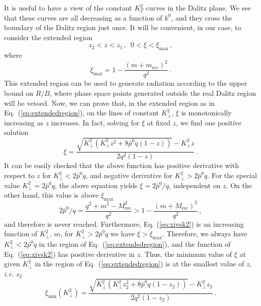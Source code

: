 \documentclass[11pt,a4paper]{article}
\newcommand{\tmop}[1]{\ensuremath{\operatorname{#1}}}
\begin{document}
It is useful to have a view of the constant $K_T^2$ curves in the Dalitz
plane. We see that these curves are all decreasing as a function of $k^0$, and
they cross the boundary of the Dalitz region just once. It will be convenient,
in our case, to consider the extended region
\begin{equation}
  z_2 < z < z_1 \, , \, \, \, 0 < \xi < \xi_{\max} \, , \label{eq:extendedregion}
\end{equation}
where
\begin{equation}
  \xi_{\max} = 1 - \frac{(m + m_{\tmop{rec}})^2}{q^2} \, .
\end{equation}
This extended region can be used to generate radiation according to the upper
bound on $R / B$, where phase space points generated outside the real Dalitz
region will be vetoed. Now, we can prove that, in the extended region
as in Eq.~(\ref{eq:extendedregion}), on the lines of constant $K_{\perp}^2$, $\xi$ is
monotonically increasing as $z$ increases. In fact, solving for $\xi$ at fixed
$z$, we find one positive solution
\begin{equation}
  \xi = \frac{\sqrt{K_{\perp}^2 \left( K_{\perp}^2 z^2 + 8 \bar{p}^0 q (1 - z)
  \right)} - K_{\perp}^2 z}{2 q^2 (1 - z)} \, . \label{eq:xivsk2}
\end{equation}
It can be easily checked that the above function has positive derivative with
respect to $z$ for $K_{\perp}^2 < 2 \bar{p}^0 q$, and negative derivative for
$K_{\perp}^2 > 2 \bar{p}^0 q$. For the special value $K_{\perp}^2 = 2
\bar{p}^0 q$, the above equation yields $\xi = 2 \bar{p}^0 / q$, independent
on $z$. On the other hand, this value is above $\xi_{\max}$
\begin{equation}
  2 \bar{p}^0 / q = \frac{q^2 + m^2 - M_{\tmop{rec}}^2}{q^2} > 1 - \frac{(m +
  M_{\tmop{rec}})^2}{q^2} \, ,
\end{equation}
and therefore is never reached. Furthermore, Eq. (\ref{eq:xivsk2}) is an
increasing function of $K_{\perp}^2$, so, for $K_{\perp}^2 > 2 \bar{p}^0 q$ we
have $\xi > \xi_{\max}$. Therefore, we always have $K_{\perp}^2 < 2 \bar{p}^0
q$ in the region of Eq.~(\ref{eq:extendedregion}), and the function of Eq.~(\ref{eq:xivsk2}) has
positive derivative in $z$. Thus, the minimum value of $\xi$ at given
$K_{\perp}^2$ in the region of Eq.~(\ref{eq:extendedregion}) is at the smallest value of
$z$, {\it i.e.} $z_2$
\begin{equation}
  \xi_{\min} (K_{\perp}^2) = \frac{\sqrt{K_{\perp}^2 \left( K_{\perp}^2 z_2^2
  + 8 \bar{p}^0 q (1 - z_2) \right)} - K_{\perp}^2 z_2}{2 q^2 (1 - z_2)} \, .
\end{equation}
\end{document}
